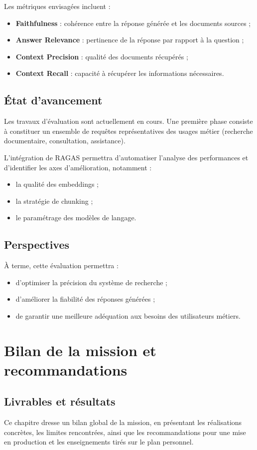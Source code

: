 \documentclass[12pt,a4paper]{report}
\begin{document}
Les métriques envisagées incluent :
\begin{itemize}
  \item \textbf{Faithfulness} : cohérence entre la réponse générée et les documents sources ;
  \item \textbf{Answer Relevance} : pertinence de la réponse par rapport à la question ;
  \item \textbf{Context Precision} : qualité des documents récupérés ;
  \item \textbf{Context Recall} : capacité à récupérer les informations nécessaires.
\end{itemize}

\section{État d’avancement}
Les travaux d’évaluation sont actuellement en cours. Une première phase consiste à constituer un ensemble de requêtes représentatives des usages métier (recherche documentaire, consultation, assistance).

L’intégration de RAGAS permettra d’automatiser l’analyse des performances et d’identifier les axes d’amélioration, notamment :
\begin{itemize}
  \item la qualité des embeddings ;
  \item la stratégie de chunking ;
  \item le paramétrage des modèles de langage.
\end{itemize}

\section{Perspectives}
À terme, cette évaluation permettra :
\begin{itemize}
  \item d’optimiser la précision du système de recherche ;
  \item d’améliorer la fiabilité des réponses générées ;
  \item de garantir une meilleure adéquation aux besoins des utilisateurs métiers.
\end{itemize}

\chapter{Bilan de la mission et recommandations}
\section{Livrables et résultats}
Ce chapitre dresse un bilan global de la mission, en présentant les réalisations concrètes, les limites rencontrées, ainsi que les recommandations pour une mise en production et les enseignements tirés sur le plan personnel.
\end{document}
